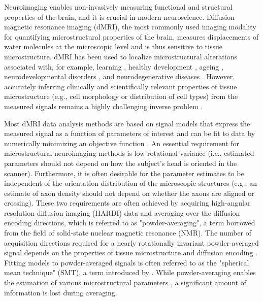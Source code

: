 \documentclass[10pt, letterpaper, oneside]{article}
\begin{document}
Neuroimaging enables non-invasively measuring functional and structural properties of the brain, and it is crucial in modern neuroscience. Diffusion magnetic resonance imaging (dMRI), the most commonly used imaging modality for quantifying microstructural properties of the brain, measures displacements of water molecules at the microscopic level and is thus sensitive to tissue microstructure. dMRI has been used to localize microstructural alterations associated with, for example, learning \citep{sagi2012learning}, healthy development \citep{lebel2019review}, ageing \citep{sullivan2006diffusion}, neurodevelopmental disorders \citep{gibbard2018structural}, and neurodegenerative diseases \citep{zhang2009white}. However, accurately inferring clinically and scientifically relevant properties of tissue microstructure (e.g., cell morphology or distribution of cell types) from the measured signals remains a highly challenging inverse problem \citep{kiselev2017fundamentals}.

Most dMRI data analysis methods are based on signal models that express the measured signal as a function of parameters of interest and can be fit to data by numerically minimizing an objective function \citep{novikov2019quantifying}. An essential requirement for microstructural neuroimaging methods is low rotational variance (i.e., estimated parameters should not depend on how the subject's head is oriented in the scanner). Furthermore, it is often desirable for the parameter estimates to be independent of the orientation distribution of the microscopic structures (e.g., an estimate of axon density should not depend on whether the axons are aligned or crossing). These two requirements are often achieved by acquiring high-angular resolution diffusion imaging (HARDI) data and averaging over the diffusion encoding directions, which is referred to as "powder-averaging", a term borrowed from the field of solid-state nuclear magnetic resonance (NMR). The number of acquisition directions required for a nearly rotationally invariant powder-averaged signal depends on the properties of tissue microstructure and diffusion encoding \citep{szczepankiewicz2019tensor}. Fitting models to powder-averaged signals is often referred to as the "spherical mean technique" (SMT), a term introduced by \cite{kaden2016quantitative}. While powder-averaging enables the estimation of various microstructural parameters \citep{jespersen2013orientationally, lasivc2014microanisotropy, kaden2016quantitative, kaden2016multi, szczepankiewicz2016link, henriques2020correlation, palombo2020sandi, gyori2021potential}, a significant amount of information is lost during averaging.
\end{document}
